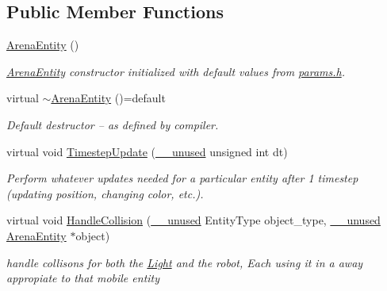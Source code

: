 \subsection*{Public Member Functions}
\begin{DoxyCompactItemize}
\item 
\mbox{\label{class_arena_entity_a96df749814e89344a6149e4da89b4e44}} 
\mbox{\hyperlink{class_arena_entity_a96df749814e89344a6149e4da89b4e44}{Arena\+Entity}} ()
\begin{DoxyCompactList}\small\item\em \mbox{\hyperlink{class_arena_entity}{Arena\+Entity}} constructor initialized with default values from \mbox{\hyperlink{params_8h}{params.\+h}}. \end{DoxyCompactList}\item 
\mbox{\label{class_arena_entity_aa7af53e5d8830d144ccf2ad07d9140da}} 
virtual \mbox{\hyperlink{class_arena_entity_aa7af53e5d8830d144ccf2ad07d9140da}{$\sim$\+Arena\+Entity}} ()=default
\begin{DoxyCompactList}\small\item\em Default destructor -- as defined by compiler. \end{DoxyCompactList}\item 
virtual void \mbox{\hyperlink{class_arena_entity_a203613c40a5cecf47606b2a59adcc3bd}{Timestep\+Update}} (\mbox{\hyperlink{common_8h_a2e3484535ee610c8e19e9859563abe48}{\+\_\+\+\_\+unused}} unsigned int dt)
\begin{DoxyCompactList}\small\item\em Perform whatever updates needed for a particular entity after 1 timestep (updating position, changing color, etc.). \end{DoxyCompactList}\item 
virtual void \mbox{\hyperlink{class_arena_entity_aa9a83946e47cf824ce50325a4599eea8}{Handle\+Collision}} (\mbox{\hyperlink{common_8h_a2e3484535ee610c8e19e9859563abe48}{\+\_\+\+\_\+unused}} Entity\+Type object\+\_\+type, \mbox{\hyperlink{common_8h_a2e3484535ee610c8e19e9859563abe48}{\+\_\+\+\_\+unused}} \mbox{\hyperlink{class_arena_entity}{Arena\+Entity}} $\ast$object)
\begin{DoxyCompactList}\small\item\em handle collisons for both the \mbox{\hyperlink{class_light}{Light}} and the robot, Each using it in a away appropiate to that mobile entity \end{DoxyCompactList}\item 

\end{DoxyCompactItemize}
